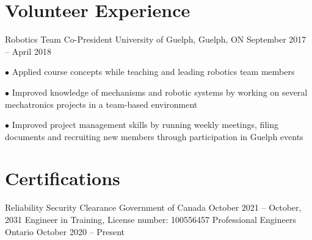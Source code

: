 \documentclass[a4paper,11pt]{article}
\begin{document}
\section{Volunteer Experience}
\resumeSubHeadingListStart

\resumeExp
{Robotics Team Co-President}
{University of Guelph, Guelph, ON}
{September 2017 -- April 2018} %
{}
\resumeItemListStart
\item[$\bullet$] Applied course concepts while teaching and leading robotics team members
\item[$\bullet$] Improved knowledge of mechanisms and robotic systems by working on several mechatronics
projects in a team-based environment
\item[$\bullet$] Improved project management skills by running weekly meetings, filing documents and
recruiting new members through participation in Guelph events
\resumeItemListEnd
\resumeSubHeadingListEnd

\section{Certifications}
\resumeSubHeadingListStart

\resumeCert
{Reliability Security Clearance}
{Government of Canada}
{October 2021 -- October, 2031}
\resumeCert
{Engineer in Training, License number: 100556457}
{Professional Engineers Ontario}
{October 2020 -- Present}
\resumeSubHeadingListEnd
\end{document}
